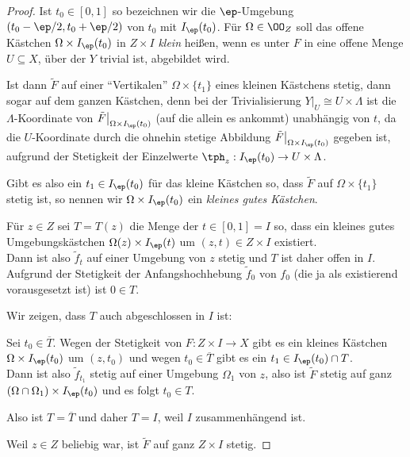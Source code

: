 \begin{proof}
Ist $t_0\in [0,1]$ so bezeichnen wir die $\ep$-Umgebung $(t_0-\ep/2,t_0+\ep/2)$
von $t_0$ mit $I_\ep(t_0)$. Für $\Omega\in\OO_Z$ soll das offene Kästchen
$\Omega\times I_\ep(t_0)$ in $Z\times I$ \emph{klein} heißen, wenn es unter $F$
in eine offene Menge $U\subseteq X$, über der $Y$ trivial ist, abgebildet wird.

Ist dann $\tilde{F}$ auf einer ``Vertikalen'' $\Omega\times\{t_1\}$ eines
kleinen Kästchens stetig, dann sogar auf dem ganzen Kästchen, denn bei der
Trivialisierung $Y\big|_U \cong U\times\Lambda$ ist die $\Lambda$-Koordinate
von $\tilde{F}\big|_{\Omega\times I_\ep(t_0)}$ (auf die allein es ankommt)
unabhängig von $t$, da die $U$-Koordinate durch die ohnehin stetige Abbildung
$\tilde{F}\big|_{\Omega\times I_\ep(t_0)}$ gegeben ist, aufgrund der Stetigkeit
der Einzelwerte $\tph_z : I_\ep(t_0) \to U\times\Lambda$.

Gibt es also ein $t_1\in I_\ep(t_0)$ für das kleine Kästchen so, dass
$\tilde{F}$ auf $\Omega\times\{t_1\}$ stetig ist, so nennen wir $\Omega\times
I_\ep(t_0)$ ein \emph{kleines gutes Kästchen}.

Für $z\in Z$ sei $T=T(z)$ die Menge der $t\in [0,1]= I$ so, dass ein kleines
gutes Umgebungskästchen $\Omega(z)\times I_\ep(t)$ um $(z,t)\in Z\times I$
existiert.\\
Dann ist also $\tilde{f}_t$ auf einer Umgebung von $z$ stetig und $T$ ist daher
offen in $I$.\\
Aufgrund der Stetigkeit der Anfangshochhebung $\tilde{f}_0$ von $f_0$ (die ja
als existierend vorausgesetzt ist) ist $0\in T$.

Wir zeigen, dass $T$ auch abgeschlossen in $I$ ist:

Sei $t_0\in\overline{T}$. Wegen der Stetigkeit von $F: Z\times I\to X$ gibt es
ein kleines Kästchen $\Omega\times I_\ep(t_0)$ um $(z,t_0)$ und wegen
$t_0\in\overline{T}$ gibt es ein $t_1\in I_\ep(t_0)\cap T$.\\
Dann ist also $\tilde{f}_{t_1}$ stetig auf einer Umgebung $\Omega_1$ von $z$,
also ist $\tilde{F}$ stetig auf ganz $(\Omega\cap \Omega_1)\times I_\ep(t_0)$
und es folgt $t_0\in T$.

Also ist $T=\overline{T}$ und daher $T=I$, weil $I$ zusammenhängend ist.

Weil $z\in Z$ beliebig war, ist $\tilde{F}$ auf ganz $Z\times I$ stetig.\qedhere
\end{proof}

